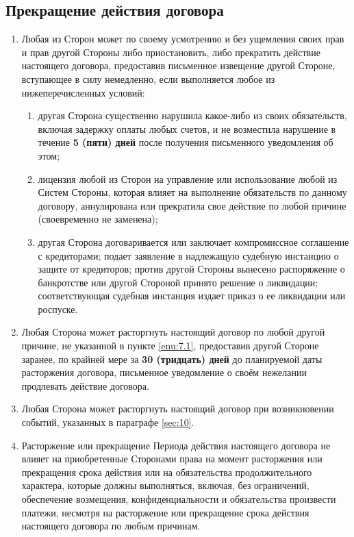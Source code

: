 \begin{Form}
     \section{Прекращение действия договора}\label{sec:8}
      \begin{enumerate}[label=\thesection.\arabic*.]
       \item  Любая из Сторон может по своему усмотрению и без ущемления своих прав и прав другой Стороны либо
              приостановить, либо прекратить действие настоящего договора, предоставив письменное извещение другой Стороне,
              вступающее в силу немедленно, если выполняется любое из нижеперечисленных условий:\label{enu:7.1}
              \begin{enumerate}[label=\theenumi\arabic*.]
                \item другая Сторона  существенно нарушила какое-либо из своих обязательств, включая задержку оплаты
                      любых счетов, и не возместила нарушение в течение \textbf{5 (пяти) дней} после получения письменного
                      уведомления об этом;
                \item лицензия любой из Сторон  на управление или использование любой из Систем Стороны, которая влияет на
                      выполнение обязательств по данному договору, аннулирована или прекратила
                      свое действие по любой причине (своевременно не заменена);
                \item другая Сторона договаривается или заключает компромиссное соглашение с кредиторами; подает заявление в надлежащую
                      судебную инстанцию о защите от кредиторов; против другой Стороны вынесено распоряжение о банкротстве или другой
                      Стороной принято решение о ликвидации; соответствующая судебная инстанция издает приказ о ее ликвидации или
                      роспуске.
              \end{enumerate}
      \item Любая Сторона  может расторгнуть настоящий договор по любой другой причине, не указанной в пункте \ref{enu:7.1},
            предоставив другой Стороне заранее, по крайней мере за \textbf{30 (тридцать) дней} до планируемой даты расторжения
            договора, письменное уведомление о своём нежелании продлевать действие договора.
      \item Любая Сторона  может расторгнуть настоящий договор при возникновении событий, указанных в параграфе \ref{sec:10}.
      \item Расторжение или прекращение Периода действия настоящего договора не влияет на приобретенные Сторонами права
            на момент расторжения или прекращения срока действия или на обязательства продолжительного характера,
            которые должны выполняться, включая, без ограничений, обеспечение возмещения, конфиденциальности и обязательства
            произвести платежи, несмотря на расторжение или прекращение срока действия настоящего договора по любым причинам.
      \end{enumerate}


\end{Form}

